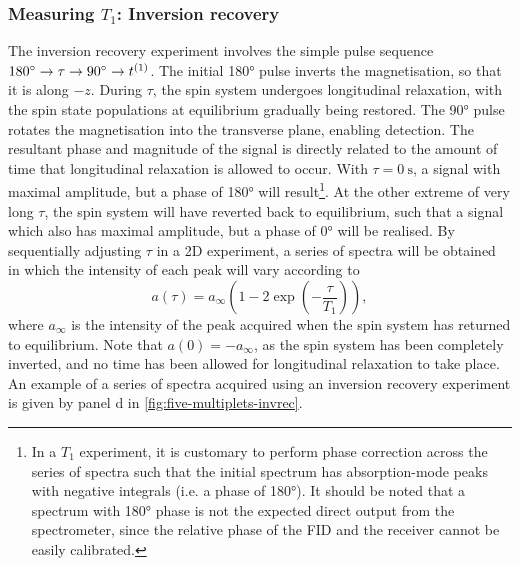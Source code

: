 \subsubsection{Measuring $T_1$: Inversion recovery}
\label{subsec:invrec}
The inversion recovery experiment involves the simple pulse sequence $\ang{180}
\rightarrow \tau \rightarrow \ang{90} \rightarrow t^{(1)}$. The initial
\ang{180} pulse inverts the magnetisation, so that it is along $-z$. During
$\tau$, the spin system undergoes longitudinal
relaxation, with the spin state populations at equilibrium gradually being
restored. The \ang{90} pulse rotates the magnetisation into the
transverse plane, enabling detection. The resultant phase and magnitude of the
signal is directly related to the amount of time that longitudinal relaxation
is allowed to occur. With $\tau = \qty{0}{\second}$, a signal with
maximal amplitude, but a phase of \ang{180} will result\footnote{
    In a $T_1$ experiment, it is customary to perform phase correction across
    the series of spectra such that the initial spectrum has absorption-mode
    peaks with negative integrals (i.e. a phase of \ang{180}). It should be
    noted that a spectrum with \ang{180} phase is not the expected direct
    output from the spectrometer, since the relative phase of the \ac{FID} and
    the receiver cannot be easily calibrated.
}. At the other extreme of
very long $\tau$, the spin system will have reverted
back to equilibrium, such that a signal which also has maximal amplitude, but a
phase of \ang{0} will be realised. By sequentially adjusting $\tau$ in a
\ac{2D} experiment, a series of spectra will be obtained in which the intensity
of each peak will vary according to
\begin{equation}
    a\left(\tau\right) = a_{\infty} \left( 1 - 2 \exp\left( -\frac{\tau}{T_1}\right) \right),
\end{equation}
where $a_{\infty}$ is the intensity of the peak acquired when the spin system
has returned to equilibrium. Note that $a(0) = -a_{\infty}$, as the spin system
has been completely inverted, and no time has been allowed for longitudinal
relaxation to take place. An example of a series of spectra acquired using an
inversion recovery experiment is given by panel d in
\cref{fig:five-multiplets-invrec}.

